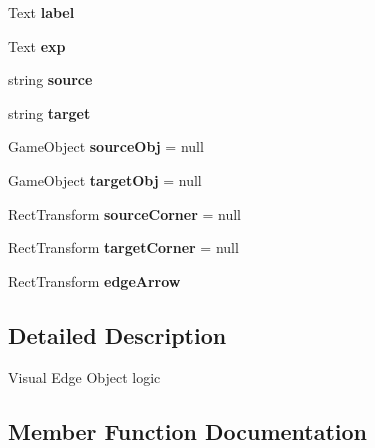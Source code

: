 \begin{DoxyCompactItemize}
\mbox{\label{class_select_edge_button_ae2195894dd4f4fe1511405f1966eaa19}} 
Text {\bfseries label}
\item 
\mbox{\label{class_select_edge_button_a8116f80bd330d6d7c8c8481155fe0e42}} 
Text {\bfseries exp}
\item 
\mbox{\label{class_select_edge_button_a61e8292864e91cc8418ba59719eae4a4}} 
string {\bfseries source}
\item 
\mbox{\label{class_select_edge_button_a7e3535b7b32c7201fdf00f4befd514cd}} 
string {\bfseries target}
\item 
\mbox{\label{class_select_edge_button_a1e1610e8f5ef52f41346973f160c0e7b}} 
Game\+Object {\bfseries source\+Obj} = null
\item 
\mbox{\label{class_select_edge_button_ab0f5e1f7057fe3fa68c424174c2fe7b3}} 
Game\+Object {\bfseries target\+Obj} = null
\item 
\mbox{\label{class_select_edge_button_ae5b245dd838ecae0377648102ba4763a}} 
Rect\+Transform {\bfseries source\+Corner} = null
\item 
\mbox{\label{class_select_edge_button_adf0325406dd21f8b89a6b57892ef56ee}} 
Rect\+Transform {\bfseries target\+Corner} = null
\item 
\mbox{\label{class_select_edge_button_a56a6d857fbec1524dbc4067a7843152f}} 
Rect\+Transform {\bfseries edge\+Arrow}
\end{DoxyCompactItemize}


\subsection{Detailed Description}
Visual Edge Object logic 



\subsection{Member Function Documentation}
\mbox{\label{class_select_edge_button_a1feacae4681c9223e93212b399a45804}} 
